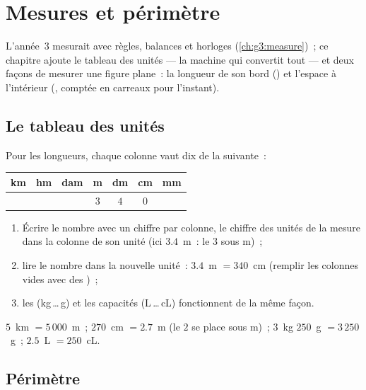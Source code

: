 \chapter{Mesures et périmètre}\label{ch:g4:measure}

L'année~3 mesurait avec règles, balances et horloges
(\cref{ch:g3:measure})~; ce chapitre ajoute le tableau des unités ---
la machine qui convertit tout --- et deux façons de mesurer une
figure plane~: la longueur de son bord () et l'espace
à l'intérieur (, comptée en carreaux pour l'instant).

\section{Le tableau des unités}

\begin{method}\label{met:g4:measure:table}
Pour les longueurs, chaque colonne vaut dix de la suivante~:
\begin{center}
\renewcommand{\arraystretch}{1.3}
\begin{tabular}{c|c|c|c|c|c|c}
km & hm & dam & m & dm & cm & mm \\
\hline
 & & & $3$ & $4$ & $0$ & \\
\end{tabular}
\end{center}
\begin{enumerate}
  \item Écrire le nombre avec un chiffre par colonne, le chiffre
        des unités de la mesure dans la colonne de son unité (ici
        $3.4$~m~: le $3$ sous m)~;
  \item lire le nombre dans la nouvelle unité~: $3.4$~m $= 340$~cm
        (remplir les colonnes vides avec des )~;
  \item les  (kg\,\dots\,g) et les capacités (L\,\dots\,cL)
        fonctionnent de la même façon.
\end{enumerate}
\end{method}

\begin{example}\label{ex:g4:measure:convert}
$5$~km $= 5\,000$~m~; \quad $270$~cm $= 2.7$~m (le $2$ se place sous
m)~; \quad $3$~kg $250$~g $= 3\,250$~g~; \quad
$2.5$~L $= 250$~cL.
\end{example}

\section{Périmètre}

